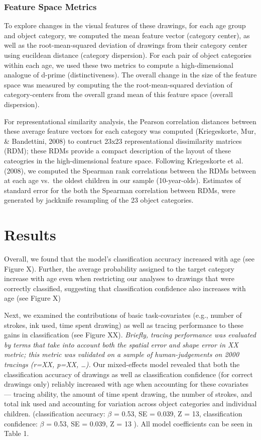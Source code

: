 \documentclass[10pt, letterpaper]{article}
\begin{document}
\subsubsection{Feature Space Metrics}\label{feature-space-metrics}

To explore changes in the visual features of these drawings, for each
age group and object category, we computed the mean feature vector
(category center), as well as the root-mean-squared deviation of
drawings from their category center using eucildean distance (category
dispersion). For each pair of object categories within each age, we used
these two metrics to compute a high-dimensional analogue of d-prime
(distinctiveness). The overall change in the size of the feature space
was measured by computing the the root-mean-squared deviation of
category-centers from the overall grand mean of this feature space
(overall dispersion).

For representational similarity analysis, the Pearson correlation
distances between these average feature vectors for each category was
computed (Kriegeskorte, Mur, \& Bandettini, 2008) to contruct 23x23
representational dissimilarity matrices (RDM); these RDMs provide a
compact description of the layout of these cateogries in the
high-dimensional feature space. Following Kriegeskorte et al. (2008), we
computed the Spearman rank correlations between the RDMs between at each
age vs.~the oldest children in our sample (10-year-olds). Estimates of
standard error for the both the Spearman correlation between RDMs, were
generated by jackknife resampling of the 23 object categories.

\section{Results}\label{results}

Overall, we found that the model's classification accuracy increased
with age (see Figure X). Further, the average probability assigned to
the target category increase with age even when restricting our analyses
to drawings that were correctly classified, suggesting that
classification confidence also increases with age (see Figure X)

Next, we examined the contributions of basic task-covariates (e.g.,
number of strokes, ink used, time spent drawing) as well as tracing
performance to these gains in classification (see Figure XX).
\emph{Briefly, tracing performance was evaluated by terms that take into
account both the spatial error and shape error in XX metric; this metric
was validated on a sample of human-judgements on 2000 tracings (r=XX,
p=XX, \ldots{}).} Our mixed-effects model revealed that both the
classification accuracy of drawings as well as classification confidence
(for correct drawings only) reliably increased with age when accounting
for these covariates --- tracing ability, the amount of time spent
drawing, the number of strokes, and total ink used and accounting for
variation across object categories and individual children.
(classification accuracy: \(\beta\) = 0.53, SE = 0.039, Z = 13,
classification confidence: \(\beta\) = 0.53, SE = 0.039, Z = 13 ). All
model coefficients can be seen in Table 1.
\end{document}
